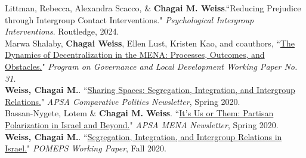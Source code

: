 \documentclass[11pt]{article}
\begin{document}
Littman, Rebecca, Alexandra Scacco, \& \textbf{Chagai M. Weiss}.``Reducing Prejudice through Intergroup Contact Interventions." \emph{Psychological Intergroup Interventions}. Routledge, 2024.\\


Marwa Shalaby, \textbf{Chagai Weiss}, Ellen Lust, Kristen Kao, and coauthors, ``\href{https://papers.ssrn.com/sol3/papers.cfm?abstract\_id=3741934}{The Dynamics of Decentralization in the MENA: Processes, Outcomes, and Obstacles.}" \textit{Program on Governance and Local Development Working Paper No. 31.}\\

\textbf{Weiss, Chagai M.}. ``\href{https://www.comparativepoliticsnewsletter.org/wp-content/uploads/2020/06/Spring-Newsletter-2020_11_Weiss.pdf}{Sharing Spaces: Segregation, Integration, and Intergroup Relations.}" \textit{APSA Comparative Politics Newsletter}, Spring 2020.\\

 Bassan-Nygete, Lotem \& \textbf{Chagai M. Weiss}. ``\href{https://apsamena.org/2020/11/19/its-us-or-them-partisan-polarization-in-israel-and-beyond/}{It's Us or Them: Partisan Polarization in Israel and Beyond.}" \textit{APSA MENA Newsletter}, Spring 2020.\\ 
 
 \textbf{Weiss, Chagai M.}. ``\href{https://pomeps.org/segregation-integration-and-intergroup-relations-in-israel}{Segregation, Integration, and Intergroup Relations in Israel.}" \emph{POMEPS Working Paper}, Fall 2020. 
 
\end{document}

